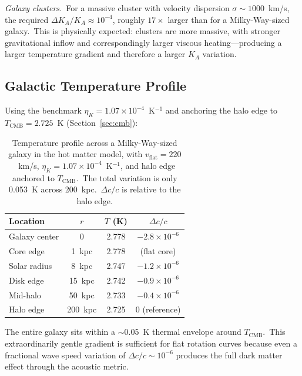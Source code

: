 \documentclass[12pt,letterpaper]{article}
\newcommand{\Ka}{K_{\!A}}
\newcommand{\etaK}{\eta_{\!K}}
\begin{document}
\emph{Galaxy clusters.}\ For a massive cluster with velocity dispersion
$\sigma \sim 1000$~km/s, the required $\Delta\Ka/\Ka \approx 10^{-4}$,
roughly $17\times$ larger than for a Milky-Way-sized galaxy.\ This is
physically expected: clusters are more massive, with stronger gravitational
inflow and correspondingly larger viscous heating---producing a larger
temperature gradient and therefore a larger $\Ka$ variation.


\subsection{Galactic Temperature Profile}
\label{sec:gal-profile}

Using the benchmark $\etaK = 1.07 \times 10^{-4}$~K$^{-1}$ and
anchoring the halo edge to $T_{\mathrm{CMB}} = 2.725$~K
(Section~\ref{sec:cmb}):

\begin{table}[h]
\centering
\begin{tabular}{@{}lccc@{}}
\toprule
Location & $r$ & $T$ (K) & $\Delta c/c$ \\
\midrule
Galaxy center    & 0         & 2.778 & $-2.8 \times 10^{-6}$ \\
Core edge        & 1~kpc     & 2.778 & (flat core) \\
Solar radius     & 8~kpc     & 2.747 & $-1.2 \times 10^{-6}$ \\
Disk edge        & 15~kpc    & 2.742 & $-0.9 \times 10^{-6}$ \\
Mid-halo         & 50~kpc    & 2.733 & $-0.4 \times 10^{-6}$ \\
Halo edge        & 200~kpc   & 2.725 & 0 (reference) \\
\bottomrule
\end{tabular}
\caption{Temperature profile across a Milky-Way-sized galaxy in the hot matter
  model, with $v_{\mathrm{flat}} = 220$~km/s, $\etaK = 1.07 \times
  10^{-4}$~K$^{-1}$, and halo edge anchored to $T_{\mathrm{CMB}}$.\ The total
  variation is only 0.053~K across 200~kpc.\ $\Delta c/c$ is relative to the
  halo edge.}
\label{tab:gal-profile}
\end{table}

The entire galaxy sits within a $\sim$0.05~K thermal envelope around
$T_{\mathrm{CMB}}$.\ This extraordinarily gentle gradient is sufficient
for flat rotation curves because even a fractional wave speed variation
of $\Delta c/c \sim 10^{-6}$ produces the full dark matter effect through
the acoustic metric.
\end{document}
